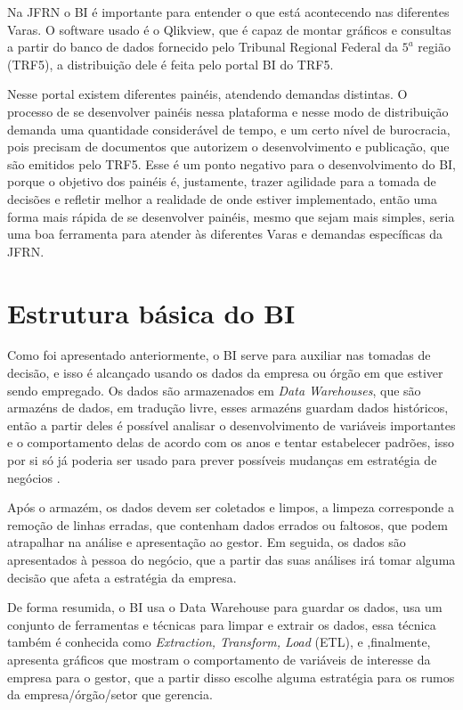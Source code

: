 Na JFRN o BI é importante para entender o que está acontecendo nas diferentes Varas. O software usado é o Qlikview, que é capaz de montar gráficos e consultas a partir do banco de dados fornecido pelo Tribunal Regional Federal da $5^{a}$ região (TRF5), a distribuição dele é feita pelo portal BI do TRF5.

Nesse portal existem diferentes painéis, atendendo demandas distintas. O processo de se desenvolver painéis nessa plataforma e nesse modo de distribuição demanda uma quantidade considerável de tempo, e um certo nível de burocracia, pois precisam de documentos que autorizem o desenvolvimento e publicação, que são emitidos pelo TRF5. Esse é um ponto negativo para o desenvolvimento do BI, porque o objetivo dos painéis é, justamente, trazer agilidade para a tomada de decisões e refletir melhor a realidade de onde estiver implementado, então uma forma mais rápida de se desenvolver painéis, mesmo que sejam mais simples, seria uma boa ferramenta para atender às diferentes Varas e demandas específicas da JFRN.

\section{Estrutura básica do BI}

Como foi apresentado anteriormente, o BI serve para auxiliar nas tomadas de decisão, e isso é alcançado usando os dados da empresa ou órgão em que estiver sendo empregado. Os dados são armazenados em \textit{Data Warehouses}, que são armazéns de dados, em tradução livre, esses armazéns guardam dados históricos, então a partir deles é possível analisar o desenvolvimento de variáveis importantes e o comportamento delas de acordo com os anos e tentar estabelecer padrões, isso por si só já poderia ser usado para prever possíveis mudanças em estratégia de negócios \cite{negash1}.

Após o armazém, os dados devem ser coletados e limpos, a limpeza corresponde a remoção de linhas erradas, que contenham dados errados ou faltosos, que podem atrapalhar na análise e apresentação ao gestor. Em seguida, os dados são apresentados à pessoa do negócio, que a partir das suas análises irá tomar alguma decisão que afeta a estratégia da empresa. 

De forma resumida, o BI usa o Data Warehouse para guardar os dados, usa um conjunto de ferramentas e técnicas para limpar e extrair os dados, essa técnica também é conhecida como \textit{Extraction, Transform, Load} (ETL), e ,finalmente, apresenta gráficos que mostram o comportamento de variáveis de interesse da empresa para o gestor, que a partir disso escolhe alguma estratégia para os rumos da empresa/órgão/setor que gerencia.

